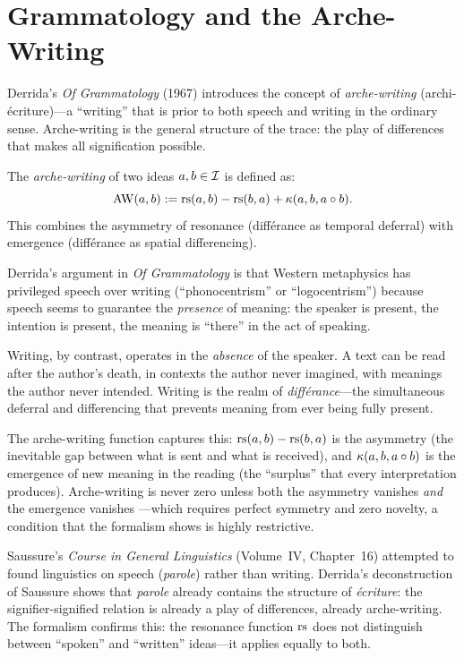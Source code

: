 \section{Grammatology and the Arche-Writing}
\label{sec:grammatology}

Derrida's \textit{Of Grammatology} (1967) introduces the concept of
\emph{arche-writing} (archi-\'ecriture)---a ``writing'' that is prior to both
speech and writing in the ordinary sense. Arche-writing is the general structure
of the trace: the play of differences that makes all signification possible.

\begin{definition}
\label{def:arche-writing}
The \emph{arche-writing} of two ideas $a, b \in \mathcal{I}$ is defined as:
\[
\mathrm{AW}(a, b) := \mathrm{rs}(a, b) - \mathrm{rs}(b, a) + \kappa(a, b, a \circ b).
\]
This combines the asymmetry of resonance (diff\'erance as temporal deferral)
with emergence (diff\'erance as spatial differencing).
\end{definition}

\begin{interpretation}
Derrida's argument in \textit{Of Grammatology} is that Western metaphysics
has privileged speech over writing (``phonocentrism'' or ``logocentrism'')
because speech seems to guarantee the \emph{presence} of meaning: the speaker
is present, the intention is present, the meaning is ``there'' in the act
of speaking.

Writing, by contrast, operates in the \emph{absence} of the speaker. A text
can be read after the author's death, in contexts the author never imagined,
with meanings the author never intended. Writing is the realm of
\emph{diff\'erance}---the simultaneous deferral and differencing that
prevents meaning from ever being fully present.

The arche-writing function captures this: $\mathrm{rs}(a,b) - \mathrm{rs}(b,a)$ is the
asymmetry (the inevitable gap between what is sent and what is received), and
$\kappa(a,b, a \circ b)$ is the emergence of new meaning in the reading
(the ``surplus'' that every interpretation produces). Arche-writing is never
zero unless both the asymmetry vanishes \emph{and} the emergence vanishes
---which requires perfect symmetry and zero novelty, a condition that the
formalism shows is highly restrictive.

Saussure's \textit{Course in General Linguistics} (Volume~IV, Chapter~16)
attempted to found linguistics on speech (\textit{parole}) rather than writing.
Derrida's deconstruction of Saussure shows that \textit{parole} already
contains the structure of \textit{\'ecriture}: the signifier-signified
relation is already a play of differences, already arche-writing.
The formalism confirms this: the resonance function $\mathrm{rs}$ does not
distinguish between ``spoken'' and ``written'' ideas---it applies
equally to both.
\end{interpretation}

